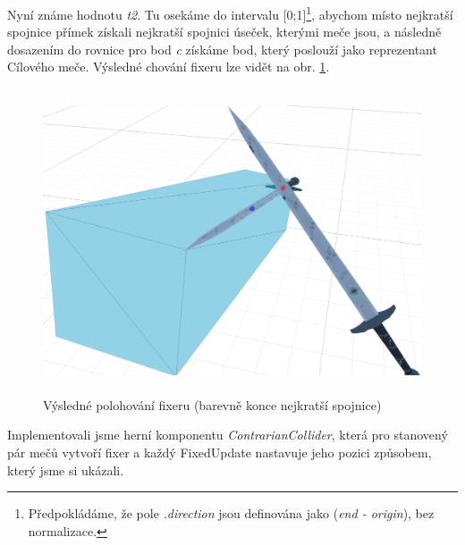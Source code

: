 Nyní známe hodnotu \textit{t2}. Tu osekáme do intervalu [0;1]\footnote{Předpokládáme, že pole \textit{.direction} jsou definována jako (\textit{end - origin}), bez normalizace.}, abychom místo nejkratší spojnice přímek získali nejkratší spojnici úseček, kterými meče jsou, a následně dosazením do rovnice pro bod \textit{c} získáme bod, který poslouží jako reprezentant Cílového meče. Výsledné chování fixeru lze vidět na obr. \ref{obr05:fixerPositioning}.


\begin{figure}[ht]\centering
  \center
  \includegraphics[height=90mm]{../img/collisionFix-show1.png}
  \caption{Výsledné polohování fixeru (barevně konce nejkratší spojnice)}
  \label{obr05:fixerPositioning}
\end{figure} 

Implementovali jsme herní komponentu \textit{ContrarianCollider}, která pro stanovený pár mečů vytvoří fixer a každý FixedUpdate nastavuje jeho pozici způsobem, který jsme si ukázali.

\pagebreak

